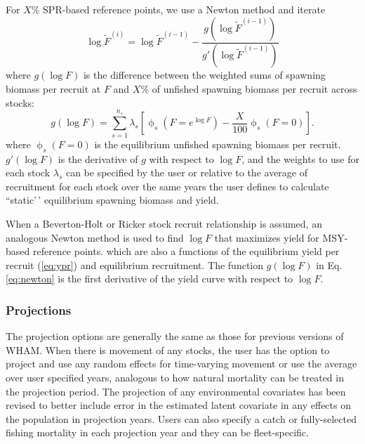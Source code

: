 \documentclass[
]{article}
\begin{document}
For \(X\%\) SPR-based reference points, we use a Newton method and
iterate \begin{equation}\label{eq:newton}
  \log\widetilde{F}^{(i)} = \log\widetilde{F}^{(i-1)} - \frac{g\left(\log\widetilde{F}^{(i-1)}\right)}{g'\left(\log\widetilde{F}^{(i-1)}\right)}
\end{equation} where \(g(\log F)\) is the difference between the
weighted sums of spawning biomass per recruit at \(F\) and \(X\)\% of
unfished spawning biomass per recruit across stocks:
\begin{equation}\label{eq:newton-obj}
  g(\log F) = \sum^{n_s}_{s=1} \lambda_s\left[\upphi_s\left(F = e^{\log F}\right) - \frac{X}{100}\upphi_s\left(F=0\right)\right].
\end{equation} where \(\upphi_s\left(F=0\right)\) is the equilibrium
unfished spawning biomass per recruit. \(g'(\log F)\) is the derivative
of \(g\) with respect to \(\log F\), and the weights to use for each
stock \(\lambda_s\) can be specified by the user or relative to the
average of recruitment for each stock over the same years the user
defines to calculate ``static'\,' equilibrium spawning biomass and
yield.

When a Beverton-Holt or Ricker stock recruit relationship is assumed, an
analogous Newton method is used to find \(\log F\) that maximizes yield
for MSY-based reference points. which are also a functions of the
equilibrium yield per recruit (\ref{eq:ypr}) and equilibrium
recruitment. The function \(g(\log F)\) in Eq. \ref{eq:newton} is the
first derivative of the yield curve with respect to \(\log F\).

\hypertarget{projections}{%
\subsubsection*{Projections}\label{projections}}

The projection options are generally the same as those for previous
versions of WHAM. When there is movement of any stocks, the user has the
option to project and use any random effects for time-varying movement
or use the average over user specified years, analogous to how natural
mortality can be treated in the projection period. The projection of any
environmental covariates has been revised to better include error in the
estimated latent covariate in any effects on the population in
projection years. Users can also specify a catch or fully-selected
fishing mortality in each projection year and they can be
fleet-specific.
\end{document}
